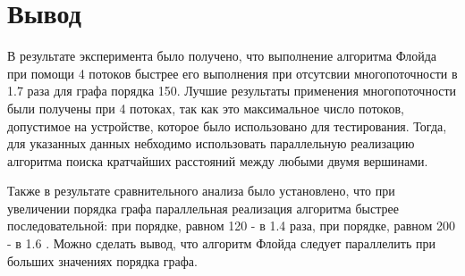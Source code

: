 \section{Вывод}

В результате эксперимента было получено, что выполнение алгоритма Флойда при помощи 4 потоков быстрее его выполнения при отсутсвии многопоточности в 1.7 раза для графа порядка 150. Лучшие результаты применения многопоточности были получены при 4 потоках, так как это максимальное число потоков, допустимое на устройстве, которое было использовано для тестирования. Тогда, для указанных данных небходимо использовать параллельную реализацию алгоритма поиска кратчайших расстояний между любыми двумя вершинами.

Также в результате сравнительного анализа было установлено, что при увеличении порядка графа параллельная реализация алгоритма быстрее последовательной: при порядке, равном 120 - в 1.4 раза, при порядке, равном 200 - в 1.6 . Можно сделать вывод, что алгоритм Флойда следует параллелить при больших значениях порядка графа.